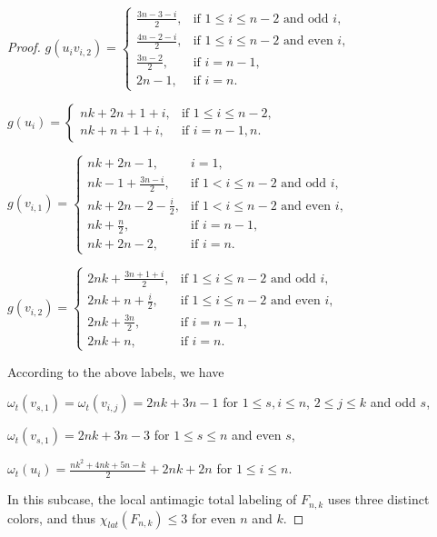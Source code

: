 \documentclass[10pt,a4paper]{amsart}
\begin{document}
\begin{proof}
$g(u_{i}v_{i,2})=\begin{cases}
\frac{3n-3-i}{2}, & \text{if $1\leq i\leq n-2$ and odd $i$},\\[4pt]
\frac{4n-2-i}{2}, & \text{if $1\leq i\leq n-2$ and even $i$},\\[4pt]
\frac{3n-2}{2},     &\text{if } i=n-1,\\[4pt]
2n-1, &\text{if }i=n.\end{cases}$\vspace{0.4em}

$g(u_{i})=\begin{cases}
nk+2n+1+i, & \text{if $1\leq i\leq n-2$},\\[4pt]
nk+n+1+i,        & \text{if $i=n-1,n$}.\end{cases}$\vspace{0.4em}

$g(v_{i,1})=\begin{cases}
nk+2n-1, & i=1,\\[4pt]
nk-1+\frac{3n-i}{2}, & \text{if $1<i\leq n-2$ and odd $i$},\\[4pt]
nk+2n-2-\frac{i}{2},        & \text{if $1< i\leq n-2$ and even $i$},\\[4pt]
nk+\frac{n}{2},  &\text{if } i=n-1,\\[4pt]
nk+2n-2, &\text{if }i=n.\end{cases}$\vspace{0.4em}

$g(v_{i,2})=\begin{cases}
2nk+\frac{3n+1+i}{2}, & \text{if $1\leq i\leq n-2$ and odd $i$},\\[4pt]
2nk+n+\frac{i}{2},        & \text{if $1\leq i\leq n-2$ and even $i$},\\[4pt]
2nk+\frac{3n}{2},         & \text{if } i=n-1,\\[4pt]
2nk+n, &\text{if }i=n.\end{cases}$\vspace{0.4em}

\noindent According to the above labels, we have

$\omega_{t}(v_{s,1})=\omega_{t}(v_{i,j})=2nk+3n-1$ for $1\leq s,i\leq n$, $2\leq j\leq k$ and odd $s$,

$\omega_{t}(v_{s,1})=2nk+3n-3$ for $1\leq s\leq n$ and even $s$,

$\omega_{t}(u_{i})=\frac{nk^{2}+4nk+5n-k}{2}+2nk+2n$ for $1\leq i\leq n$.

\noindent In this subcase, the local antimagic total labeling of $F_{n,k}$ uses three distinct colors, and thus $\chi_{lat}(F_{n,k})\leq 3$ for even $n$ and $k$.


\end{proof}
\end{document}
